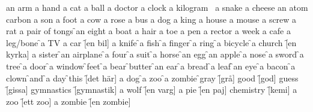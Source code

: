 \begin{questions}
    \begin{multicols}{3}
        \raggedcolumns
        \question an arm \fillin
        \question a hand \fillin
        \question a cat \fillin
        \question a ball \fillin
        \question a doctor \fillin
        \question a clock \fillin
        \question a kilogram \fillin
        \question a snake \fillin
        \question a cheese \fillin
        \question an atom \fillin
        \question carbon \fillin
        \question a son \fillin
        \question a foot \fillin
        \question a cow \fillin
        \question a rose \fillin
        \question a bus \fillin
        \question a dog \fillin
        \question a king \fillin
        \question a house \fillin
        \question a mouse \fillin
        \question a screw \fillin
        \question a rat \fillin
        \question a pair of tongs \f
        \question an eight \fillin
        \question a boat \fillin
        \question a hair \fillin
        \question a toe \fillin
        \question a pen \fillin
        \question a rector \fillin
        \question a week \fillin
        \question a cafe \fillin
        \question a leg/bone \f
        \question a TV \fillin
        \question a car \f[en bil]
        \question a knife \f
        \question a fish \f
        \question a finger \f
        \question a ring \f
        \question a bicycle \f
        \question a church \f[en kyrka]
        \question a sister \f
        \question an airplane \f
        \question a four \f
        \question a suit \f
        \question a horse \f
        \question an egg \f
        \question an apple \f
        \question a nose \f
        \question a sword \f
        \question a tree \f
        \question a door \f
        \question a window \f
        \question feet \f
        \question a bear \f
        \question butter \f
        \question an ear \f
        \question a bread \f
        \question a leaf \f
        \question an eye \f
        \question a bacon \f
        \question a clown \f
        \question and \f
        \question a day \f
        \question this \f[det här]
        \question a dog \f
        \question a zoo \f
        \question a zombie \f
        \question gray \f[grå]
        \question good \f[god]
        \question guess \f[gissa]
        \question gymnastics \f[gymnastik]
        \question a wolf \f[en varg]
        \question a pie \f[en paj]
        \question chemistry \f[kemi]
        \question a zoo \f[ett zoo]
        \question a zombie \f[en zombie]
    \end{multicols}
\end{questions}